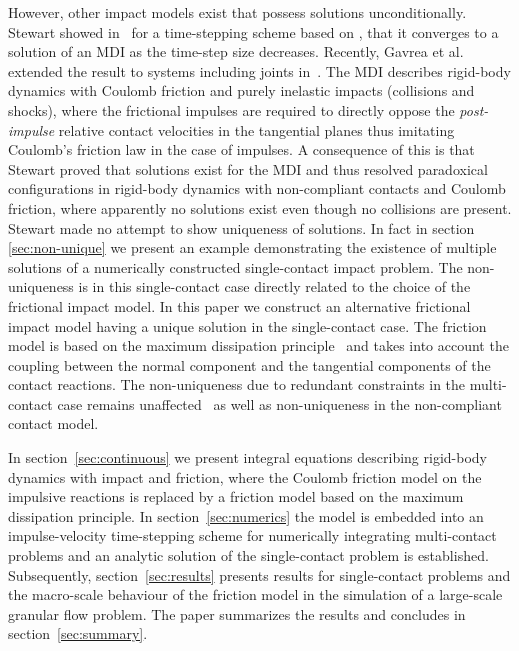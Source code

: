 \documentclass[global,twocolumn]{svjour}
\begin{document}
		However, other impact models exist that possess solutions unconditionally. Stewart showed
		in~\cite{stewart98} for a time-stepping scheme based on \cite{anitescu97},
		that it converges to a solution of an MDI as the time-step
		size decreases. Recently, Gavrea et al. extended the result to systems including joints
		in~\cite{gavrea08}. The
		MDI describes rigid-body dynamics with Coulomb friction and purely inelastic impacts (collisions and shocks),
		where the frictional impulses are required to directly oppose the \emph{post-impulse}
		relative contact velocities in the tangential planes thus imitating Coulomb's
		friction law in the case of impulses. A consequence of this is that Stewart proved
		that solutions exist for the MDI and thus resolved paradoxical
		configurations in rigid-body dynamics with non-compliant contacts and Coulomb friction,
		where apparently no solutions exist even though no collisions are present. Stewart made no attempt to show uniqueness
		of solutions. In fact in section \ref{sec:non-unique} we present an example demonstrating the
		existence of multiple solutions of a numerically constructed single-contact impact problem.
		The non-uniqueness is in this single-contact case directly related to the choice of the frictional impact model.
		In this paper we construct an alternative frictional impact model having a
		unique solution in the single-contact case. The friction model is based on the
		maximum dissipation principle~\cite{stewart00} and takes into account the coupling between the normal component
		and the tangential components of the contact reactions. The non-uniqueness
		due to redundant constraints in the multi-contact case remains unaffected~\cite{popa15}
		as well as non-uniqueness in the non-compliant contact model.
		
		In section~\ref{sec:continuous} we present integral equations describing
		rigid-body dynamics with impact and friction, where the Coulomb friction model
		on the impulsive reactions is replaced by a friction model based on the
		maximum dissipation principle. In section~\ref{sec:numerics} the model
		is embedded into an impulse-velocity time-stepping scheme for numerically
		integrating multi-contact problems and an analytic solution of the
		single-contact problem is established. Subsequently, section~\ref{sec:results}
		presents results for single-contact problems and the
		macro-scale behaviour of the friction model in the simulation of a
		large-scale granular flow problem. The paper summarizes the results and concludes in
		section~\ref{sec:summary}.
\end{document}
